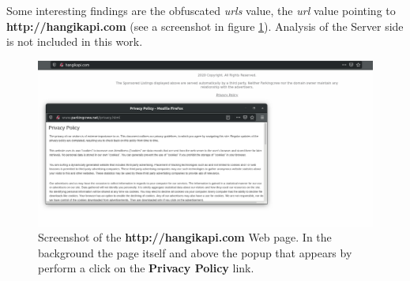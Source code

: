 \documentclass[10pt,titlepage]{article}
\begin{document}
Some interesting findings are the obfuscated \textit{urls} value, the \textit{url} value pointing to \textbf{http://hangikapi.com} (see a screenshot in figure \ref{fig:hangikapiscreenshot}).
Analysis of the Server side is not included in this work.

\begin{figure}[H]
  \begin{center}
  \includegraphics[width=\linewidth]{hangikapicom.png}
  \end{center}
  \caption{Screenshot of the \textbf{http://hangikapi.com} Web page. In the background the page itself and above the popup that appears by perform a click on the \textbf{Privacy Policy} link.}
  \label{fig:hangikapiscreenshot}
\end{figure}
\end{document}
